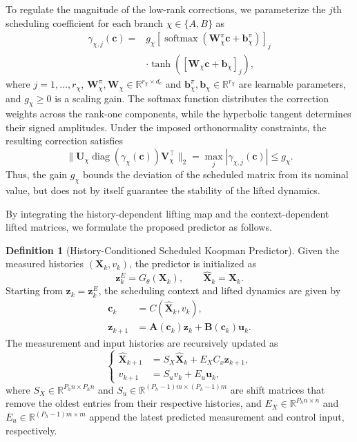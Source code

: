 \documentclass[journal]{IEEEtran}
\newcommand{\vb}{\mathbf{b}}
\newcommand{\vu}{\mathbf{u}}
\newcommand{\vz}{\mathbf{z}}
\newcommand{\vc}{\mathbf{c}}
\newcommand{\mA}{\mathbf{A}}
\newcommand{\mB}{\mathbf{B}}
\newcommand{\mU}{\mathbf{U}}
\newcommand{\mV}{\mathbf{V}}
\newcommand{\mW}{\mathbf{W}}
\newcommand{\mX}{\mathbf{X}}
\newcommand{\R}{\mathbb{R}}
\newcommand{\norm}[2][]{\mathopen{#1\lVert}#2\mathclose{#1\rVert}}
\theoremstyle{plain}
\theoremstyle{definition}
\theoremstyle{definition}
\newtheorem{definition}{Definition}
\newcommand{\envend}{\leavevmode\unskip\penalty9999 \hbox{}\nobreak\hfill\quad\hbox{\IEEEQEDopen}}
\begin{document}
To regulate the magnitude of the low-rank corrections,
we parameterize the $j$th scheduling coefficient for each
branch $\chi\in\{A,B\}$ as
\begin{equation}
\begin{aligned}
\gamma_{\chi,j}(\vc)
={}&g_\chi\left[\operatorname{softmax}
(\mW_\chi^\pi\vc+\vb_\chi^\pi)\right]_j\\
&\cdot\tanh\left([\mW_\chi\vc+\vb_\chi]_j\right),
\end{aligned}
\label{eq:scheduling_function}
\end{equation}
where $j=1,\ldots,r_\chi$,
$\mW_\chi^\pi,\mW_\chi\in\R^{r_\chi\times d_c}$ and
$\vb_\chi^\pi,\vb_\chi\in\R^{r_\chi}$ are learnable parameters,
and $g_\chi\geq0$ is a scaling gain.
The softmax function distributes the correction weights
across the rank-one components, while the hyperbolic tangent
determines their signed amplitudes. Under the imposed orthonormality constraints, the resulting
correction satisfies
\begin{equation}
\norm{\mU_\chi\operatorname{diag}(\gamma_\chi(\vc))
\mV_\chi^\top}_2
=\max_j|\gamma_{\chi,j}(\vc)|\leq g_\chi.
\label{eq:gain_bound}
\end{equation}
Thus, the gain $g_\chi$ bounds the deviation of the scheduled
matrix from its nominal value, but does not by itself
guarantee the stability of the lifted dynamics.

By integrating the history-dependent lifting map and the
context-dependent lifted matrices, we formulate the proposed
predictor as follows.

\begin{definition}[History-Conditioned Scheduled Koopman Predictor]
\label{def:history_scheduled_predictor}
Given the measured histories $(\mX_k,v_k)$,
the predictor is initialized as
\begin{equation}
\vz_k^E=G_\theta(\mX_k),\qquad
\widehat{\mX}_k=\mX_k.
\label{eq:encoded_initialization}
\end{equation}
Starting from $\vz_k=\vz_k^E$, the scheduling context and
lifted dynamics are given by
\begin{align}
\vc_k&=C(\widehat{\mX}_k,v_k),
\label{eq:context_at_step}\\
\vz_{k+1}&=\mA(\vc_k)\vz_k+\mB(\vc_k)\vu_k.
\label{eq:lifted_recursive_dynamics}
\end{align}
The measurement and input histories are recursively updated as
\begin{equation}
\left\{
\begin{aligned}
\widehat{\mX}_{k+1}
&=S_X\widehat{\mX}_k+E_XC_x\vz_{k+1},\\
v_{k+1}
&=S_uv_k+E_u\vu_k,
\end{aligned}
\right.
\label{eq:history_window_update}
\end{equation}
where $S_X\in\R^{P_hn\times P_hn}$ and
$S_u\in\R^{(P_h-1)m\times(P_h-1)m}$ are shift matrices
that remove the oldest entries from their respective histories,
and $E_X\in\R^{P_hn\times n}$ and
$E_u\in\R^{(P_h-1)m\times m}$ append the latest predicted
measurement and control input, respectively.\envend
\end{definition}
\end{document}
